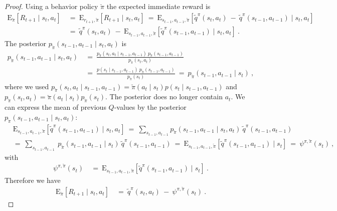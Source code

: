 \documentclass{article}
\newcommand\EXP{\mathbf{\mathrm{E}}}
\begin{document}
\begin{appendices}
\begin{proof}
Using a behavior policy 
$\breve{\pi}$ the expected immediate reward is
\begin{align}
  \EXP_{\breve{\pi}} \left[ R_{t+1} \mid s_t,a_t \right] \ &= \
  \EXP_{r_{t+1},\breve{\pi}}  \left[R_{t+1} \mid s_t,a_t \right]
   \ = \ \EXP_{s_{t-1},a_{t-1},\breve{\pi}} \left[ \tilde{q}^\pi(s_t,a_t) \ - \ 
   \tilde{q}^\pi(s_{t-1},a_{t-1}) \mid s_t,a_t \right] \\ \nonumber 
   &= \ \tilde{q}^\pi(s_t,a_t) \ - \ 
   \EXP_{s_{t-1},a_{t-1},\breve{\pi}} \left[ \tilde{q}^\pi(s_{t-1},a_{t-1}) 
   \mid s_t,a_t \right] \ .
\end{align} 
The posterior  $p_{\breve{\pi}}(s_{t-1},a_{t-1} \mid s_t, a_t)$ is
\begin{align}
 p_{\breve{\pi}}(s_{t-1},a_{t-1} \mid s_t, a_t)  \ &= \
  \frac{ p_{\breve{\pi}}(s_t,a_t \mid s_{t-1}, a_{t-1}) \
  p_{\breve{\pi}}(s_{t-1},a_{t-1})}{
    p_{\breve{\pi}}(s_t,a_t)} \\ \nonumber
  &= \  \frac{ p(s_t \mid s_{t-1}, a_{t-1}) \ p_{\breve{\pi}}(s_{t-1},a_{t-1})}{
    p_{\breve{\pi}}(s_t)}  \ = \ p_{\breve{\pi}}(s_{t-1},a_{t-1} \mid s_t )  \ ,
\end{align} 
where we used $p_{\breve{\pi}}(s_t,a_t \mid s_{t-1}, a_{t-1}) = 
\breve{\pi}(a_t \mid s_t)
p(s_t \mid s_{t-1}, a_{t-1})$ and  $p_{\breve{\pi}}(s_t,a_t)= 
\breve{\pi}(a_t \mid s_t) p_{\breve{\pi}}(s_t)$.
The posterior does no longer contain $a_t$.
We can express the mean of previous $Q$-values
by the posterior  $p_{\breve{\pi}}(s_{t-1},a_{t-1} \mid s_t, a_t)$:
\begin{align}
  &\EXP_{s_{t-1},a_{t-1},\breve{\pi}} 
  \left[ \tilde{q}^\pi(s_{t-1},a_{t-1}) \mid s_t, a_t \right] \ = \ 
  \sum_{s_{t-1},a_{t-1}} p_{\breve{\pi}}(s_{t-1},a_{t-1} \mid s_t, a_t) \
  \tilde{q}^\pi(s_{t-1},a_{t-1}) \\ \nonumber
  &= \ \sum_{s_{t-1},a_{t-1}} 
   \ p_{\breve{\pi}}(s_{t-1},a_{t-1} \mid s_t ) \
  \tilde{q}^\pi(s_{t-1},a_{t-1}) \ = \  
   \EXP_{s_{t-1},a_{t-1},\breve{\pi}} 
   \left[ \tilde{q}^\pi(s_{t-1},a_{t-1}) \mid s_t \right]
   \ = \ \psi^{\pi,\breve{\pi}}(s_t) \ , 
\end{align} 
with 
\begin{align}
  \psi^{\pi,\breve{\pi}}(s_t) \ &= \
   \EXP_{s_{t-1},a_{t-1},\breve{\pi}} 
   \left[ \tilde{q}^\pi(s_{t-1},a_{t-1}) \mid s_t \right] \ .
\end{align} 
Therefore we have
\begin{align}
   \EXP_{\breve{\pi}} \left[ R_{t+1} \mid s_t,a_t \right] \ &= \
    \tilde{q}^\pi(s_t,a_t) \ - \ \psi^{\pi,\breve{\pi}}(s_t) \ .
  \end{align}



\end{proof}
\end{appendices}
\end{document}
